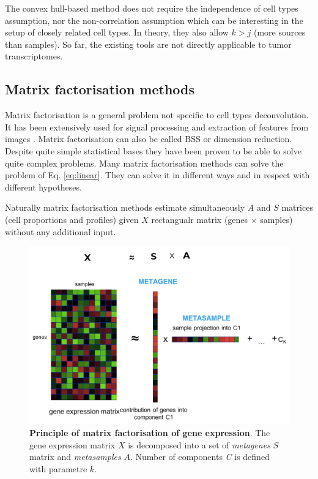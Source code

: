 \documentclass[12pt,]{book}
\theoremstyle{definition}
\theoremstyle{definition}
\theoremstyle{definition}
\theoremstyle{remark}
\begin{document}
The convex hull-based method does not require the independence of cell
types assumption, nor the non-correlation assumption which can be
interesting in the setup of closely related cell types. In theory, they
also allow \(k>j\) (more sources than samples). So far, the existing
tools are not directly applicable to tumor transcriptomes.

\hypertarget{matrix-factorisation-methods}{%
\subsection{Matrix factorisation
methods}\label{matrix-factorisation-methods}}

Matrix factorisation is a general problem not specific to cell types
deconvolution. It has been extensively used for signal processing
\citep{Zinovyev2013}and extraction of features from images
\citep{Hastie2009}. Matrix factorisation can also be called BSS or
dimension reduction. Despite quite simple statistical bases they have
been proven to be able to solve quite complex problems. Many matrix
factorisation methods can solve the problem of Eq. \eqref{eq:linear}. They
can solve it in different ways and in respect with different hypotheses.

Naturally matrix factorisation methods estimate simultaneously \(A\) and
\(S\) matrices (cell proportions and profiles) given \(X\) rectangualr
matrix (genes \(\times\) samples) without any additional input.

\begin{figure}

{\centering \includegraphics[width=1\linewidth]{figures-ext/factor} 

}

\caption[Principle of matrix factorisation of gene expression]{\textbf{Principle of matrix factorisation of gene
expression}. The gene expression matrix \(X\) is decomposed into a set
of \emph{metagenes} \(S\) matrix and \emph{metasamples} \(A\). Number of
components \emph{C} is defined with parametre \(k\).}\label{fig:fact}
\end{figure}
\end{document}
